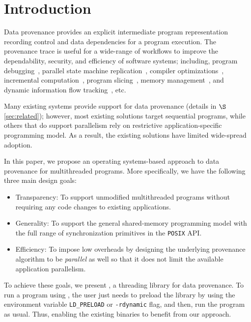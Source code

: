 \section{Introduction}
\label{sec:introduction}

Data provenance provides an explicit intermediate program representation recording control and data dependencies for a program execution.  The provenance trace is useful for a wide-range of workflows to improve the dependability, security, and efficiency of software systems; including, program debugging~\cite{fast-track-pldi}, parallel state machine replication~\cite{rex},  compiler optimizations~\cite{pgo}, incremental computation~\cite{ithreads}, program slicing~\cite{roly}, memory management~\cite{memprof}, and dynamic information flow tracking~\cite{dift}, etc. 

Many existing systems provide support for data provenance (details in $\S$\ref{sec:related}); however,
most existing solutions target sequential programs, while others that do support parallelism rely on restrictive application-specific programming model. As a result, the existing solutions have limited wide-spread adoption.



In this paper, we propose an operating systems-based approach to data provenance for multithreaded programs. More specifically, we have the following three main design goals: 
\begin{itemize} 

\item Transparency: To support unmodified multithreaded programs without requiring any code changes to existing applications. 
\item Generality: To support the general shared-memory programming model with the  full range of synchronization primitives in the {\tt POSIX} API. 
\item Efficiency: To impose low overheads by designing the underlying provenance algorithm to be  {\em parallel} as well so that it does not limit the available application parallelism.

\end{itemize}

To achieve these goals, we present \projecttitle, a threading library for data provenance. To run a program using \projecttitle,  the user just needs to preload the \projecttitle library  by using the environment variable {\tt LD\_PRELOAD} or {\tt -rdynamic} flag, and then, run the program as usual. Thus, enabling the existing binaries to benefit from our approach. 


